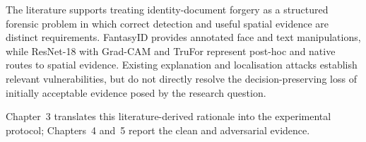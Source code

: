 The literature supports treating identity-document forgery as a structured forensic problem in which correct detection and useful spatial evidence are distinct requirements. FantasyID provides annotated face and text manipulations, while ResNet-18 with Grad-CAM and TruFor represent post-hoc and native routes to spatial evidence. Existing explanation and localisation attacks establish relevant vulnerabilities, but do not directly resolve the decision-preserving loss of initially acceptable evidence posed by the research question.

Chapter~3 translates this literature-derived rationale into the experimental protocol; Chapters~4 and~5 report the clean and adversarial evidence.
